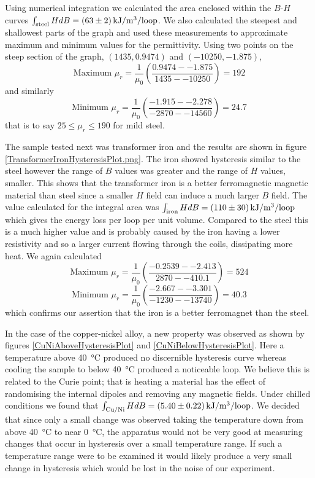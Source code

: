 \documentclass[12pt]{article}
\begin{document}
Using numerical integration we calculated the area enclosed within the $B$-$H$ curves $\int_\text{steel} H dB = \SI{63 \pm 2}{\kilo\joule\per\metre\cubed\per\text{loop}}$. We also calculated the steepest and shallowest parts of the graph and used these measurements to approximate maximum and minimum values for the permittivity. Using two points on the steep section of the graph, $(1435, 0.9474)$ and $(-10250, -1.875)$,
\begin{equation}
\text{Maximum } \mu_r = \frac{1}{\mu_0}\left(\frac{0.9474--1.875}{1435--10250}\right) = 192
\end{equation}
and similarly
\begin{equation}
\text{Minimum } \mu_r = \frac{1}{\mu_0}\left(\frac{-1.915--2.278}{-2870--14560}\right) = 24.7
\end{equation}
that is to say $25 \leq \mu_r \leq 190$ for mild steel.

The sample tested next was transformer iron and the results are shown in figure \ref{TransformerIronHysteresisPlot.png}. The iron showed hysteresis similar to the steel however the range of $B$ values was greater and the range of $H$ values, smaller. This shows that the transformer iron is a better ferromagnetic magnetic material than steel since a smaller $H$ field can induce a much larger $B$ field. The value calculated for the integral area was $\int_\text{iron} H dB = \SI{110 \pm 30}{\kilo\joule\per\metre\cubed\per\text{loop}}$ which gives the energy loss per loop per unit volume. Compared to the steel this is a much higher value and is probably caused by the iron having a lower resistivity and so a larger current flowing through the coils, dissipating more heat. We again calculated
\begin{equation}
\text{Maximum } \mu_r = \frac{1}{\mu_0}\left(\frac{-0.2539--2.413}{2870--410.1}\right) = 524
\end{equation}
\begin{equation}
\text{Minimum } \mu_r = \frac{1}{\mu_0}\left(\frac{-2.667--3.301}{-1230--13740}\right) = 40.3
\end{equation}
which confirms our assertion that the iron is a better ferromagnet than the steel.

In the case of the copper-nickel alloy, a new property was observed as shown by figures \ref{CuNiAboveHysteresisPlot} and \ref{CuNiBelowHysteresisPlot}. Here a temperature above \SI{40}{\celsius} produced no discernible hysteresis curve whereas cooling the sample to below \SI{40}{\celsius} produced a noticeable loop. We believe this is related to the Curie point; that is heating a material has the effect of randomising the internal dipoles and removing any magnetic fields. Under chilled conditions we found that $\int_\text{Cu/Ni} H dB = \SI{5.4 \pm 0.22}{\kilo\joule\per\metre\cubed\per\text{loop}}$. We decided that since only a small change was observed taking the temperature down from above \SI{40}{\celsius} to near \SI{0}{\celsius}, the apparatus would not be very good at measuring changes that occur in hysteresis over a small temperature range. If such a temperature range were to be examined it would likely produce a very small change in hysteresis which would be lost in the noise of our experiment.
\end{document}

